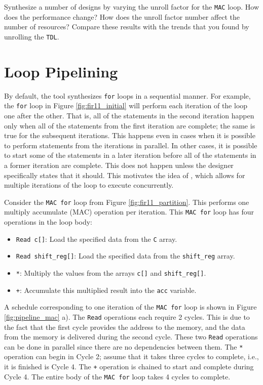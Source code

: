 \begin{exercise}
Synthesize a number of designs by varying the unroll factor for the \lstinline{MAC} loop. How does the performance change? How does the unroll factor number affect the number of resources? Compare these results with the trends that you found by unrolling the \lstinline{TDL}.   
\end{exercise}


\section{Loop Pipelining}

By default, the \VHLS tool synthesizes \lstinline{for} loops in a sequential manner. For example, the \lstinline{for} loop in Figure \ref{fig:fir11_initial} will perform each iteration of the loop one after the other. That is, all of the statements in the second iteration happen only when all of the statements from the first iteration are complete; the same is true for the subsequent iterations. This happens even in cases when it is possible to perform statements from the iterations in parallel. In other cases, it is possible to start some of the statements in a later iteration before all of the statements in a former iteration are complete. This does not happen unless the designer specifically states that it should. This motivates the idea of , which allows for multiple iterations of the loop to execute concurrently.

Consider the \lstinline{MAC for} loop from Figure \ref{fig:fir11_partition}. This performs one multiply accumulate (MAC) operation per iteration.  This \lstinline{MAC for} loop has four operations in the loop body:
\begin{itemize}
\item \lstinline{Read c[]}: Load the specified data from the \lstinline{C} array.
\item \lstinline{Read shift_reg[]}: Load the specified data from the \lstinline{shift_reg} array.
\item \lstinline{*}: Multiply the values from the arrays \lstinline{c[]} and \lstinline{shift_reg[]}.
\item \lstinline{+}: Accumulate this multiplied result into the \lstinline{acc} variable.
\end{itemize}

A schedule corresponding to one iteration of the \lstinline{MAC for} loop is shown in Figure \ref{fig:pipeline_mac} a). The \lstinline{Read} operations each require 2 cycles. This is due to the fact that the first cycle provides the address to the memory, and the data from the memory is delivered during the second cycle.  These two \lstinline{Read} operations can be done in parallel since there are no dependencies between them. The \lstinline{*} operation can begin in Cycle 2; assume that it takes three cycles to complete, i.e., it is finished is Cycle 4. The \lstinline{+} operation is chained to start and complete during Cycle 4. The entire body of the \lstinline{MAC for} loop takes 4 cycles to complete.

